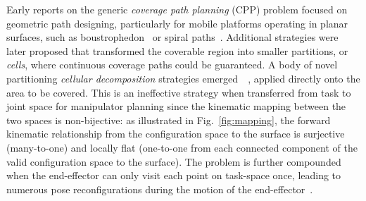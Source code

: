\documentclass[conference]{IEEEtran}
\begin{document}



Early reports on the generic \textit{coverage path planning} (CPP) problem focused on geometric path designing, particularly for mobile platforms operating in planar surfaces, such as boustrophedon~\cite{choset1998coverage} or spiral paths~\cite{hassan2018a}. 
Additional strategies were later proposed that transformed the coverable region into smaller partitions, or \textit{cells}, where continuous coverage paths could be guaranteed. A body of novel partitioning \textit{cellular decomposition} strategies emerged~\cite{choset2000exact}~\cite{huang2001optimal}, applied directly onto the area to be covered. This is an ineffective strategy when transferred from task to joint space for manipulator planning since the kinematic mapping between the two spaces is non-bijective: as illustrated in Fig.~\ref{fig:mapping}, the forward kinematic relationship from the configuration space to the surface is surjective (many-to-one) and locally flat (one-to-one from each connected component of the valid configuration space to the surface). 
The problem is further compounded when the end-effector can only visit each point on task-space once, leading to numerous pose reconfigurations during the motion of the end-effector~\cite{rososhansky2011coverage}.
\end{document}
